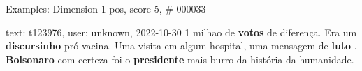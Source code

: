 \begin{frame}{Examples: Dimension 1 pos, score 5, \# 000033}
\footnotesize
\begin{exampleblock}{text: t123976, user: unknown, 2022-10-30}
1 milhao de \textbf{votos} de diferença. Era um \textbf{discursinho} pró 
vacina. Uma visita em algum hospital, uma mensagem de \textbf{luto} . 
\textbf{Bolsonaro} com certeza foi o \textbf{presidente} mais burro da história 
da humanidade. 
\end{exampleblock}
\end{frame}
